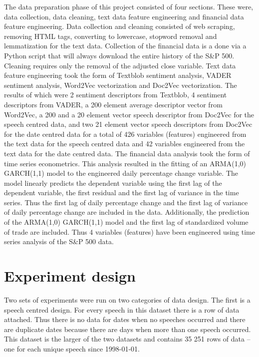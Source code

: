 \documentclass[11pt,preprint, authoryear]{elsarticle}
\numberwithin{equation}{section}
\numberwithin{figure}{section}
\numberwithin{table}{section}
\begin{document}
The data preparation phase of this project consisted of four sections.
These were, data collection, data cleaning, text data feature
engineering and financial data feature engineering. Data collection and
cleaning consisted of web scraping, removing HTML tags, converting to
lowercase, stopword removal and lemmatization for the text data.
Collection of the financial data is a done via a Python script that will
always download the entire history of the S\&P 500. Cleaning requires
only the removal of the adjusted close variable. Text data feature
engineering took the form of Textblob sentiment analysis, VADER
sentiment analysis, Word2Vec vectorization and Doc2Vec vectorization.
The results of which were 2 sentiment descriptors from Textblob, 4
sentiment descriptors from VADER, a 200 element average descriptor
vector from Word2Vec, a 200 and a 20 element vector speech descriptor
from Doc2Vec for the speech centred data, and two 21 element vector
speech descriptors from Doc2Vec for the date centred data for a total of
426 variables (features) engineered from the text data for the speech
centred data and 42 variables engineered from the text data for the date
centred data. The financial data analysis took the form of time series
econometrics. This analysis resulted in the fitting of an ARMA(1,0)
GARCH(1,1) model to the engineered daily percentage change variable. The
model linearly predicts the dependent variable using the first lag of
the dependent variable, the first residual and the first lag of variance
in the time series. Thus the first lag of daily percentage change and
the first lag of variance of daily percentage change are included in the
data. Additionally, the prediction of the ARMA(1,0) GARCH(1,1) model and
the first lag of standardized volume of trade are included. Thus 4
variables (features) have been engineered using time series analysis of
the S\&P 500 data.

\hypertarget{experiment-design}{%
\section{Experiment design}\label{experiment-design}}

Two sets of experiments were run on two categories of data design. The
first is a speech centred design. For every speech in this dataset there
is a row of data attached. Thus there is no data for dates when no
speeches occurred and there are duplicate dates because there are days
when more than one speech occurred. This dataset is the larger of the
two datasets and contains 35 251 rows of data -- one for each unique
speech since 1998-01-01.
\end{document}
